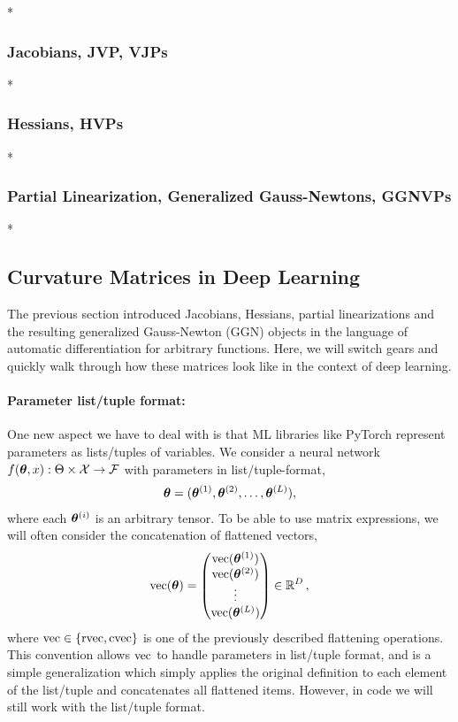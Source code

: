 \switchcolumn[0]*
\subsubsection{Jacobians, JVP, VJPs}


\switchcolumn[0]*
\subsubsection{Hessians, HVPs}


\switchcolumn[0]*
\subsubsection{Partial Linearization, Generalized Gauss-Newtons, GGNVPs}


\switchcolumn[0]*
\subsection{Curvature Matrices in Deep Learning}

The previous section introduced Jacobians, Hessians, partial linearizations and the resulting generalized Gauss-Newton (GGN) objects in the language of automatic differentiation for arbitrary functions.
Here, we will switch gears and quickly walk through how these matrices look like in the context of deep learning.

\paragraph{Parameter list/tuple format:} One new aspect we have to deal with is that ML libraries like PyTorch represent parameters as lists/tuples of variables.
We consider a neural network $f(\vtheta, x): \Theta \times \gX \to \gF$ with parameters in list/tuple-format,
\begin{align*}
  \vtheta = (\vtheta^{(1)}, \vtheta^{(2)}, \ldots, \vtheta^{(L)}),
\end{align*}
where each $\vtheta^{(i)}$ is an arbitrary tensor. To be able to use matrix expressions, we will often consider the concatenation of flattened vectors,
\begin{align*}
  \vec(\vtheta)
  =
  \begin{pmatrix}
    \vec(\vtheta^{(1)}) \\
    \vec(\vtheta^{(2)}) \\
    \vdots \\
    \vec(\vtheta^{(L)})
  \end{pmatrix}
  \in \sR^D
  \,,
\end{align*}
where $\vec \in \{ \rvec, \cvec \}$ is one of the previously described flattening operations.
This convention allows $\vec$ to handle parameters in list/tuple format, and is a simple generalization which simply applies the original definition to each element of the list/tuple and concatenates all flattened items.
However, in code we will still work with the list/tuple format.

